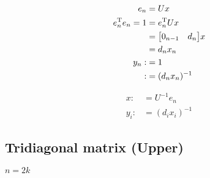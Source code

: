 \documentclass[11pt]{article}
\newcommand{\T}{\mathrm{T}}
\begin{document}
\begin{align*}
    e_{n} &= U x \\
    e_{n}^{\T} e_{n} = 1 &= e_{n}^{\T} U x \\
        &= \mqty[
            0_{n-1} & d_{n}
        ] x \\
        &= d_{n} x_{n} \\
    y_{n} :&= 1 \\
        :&= (d_{n} x_{n})^{-1}
\end{align*}

\begin{align*}
    x :&= U^{-1} e_n \\
    y_{i} :&= (d_{i} x_{i})^{-1}
\end{align*}




\newpage
\subsection{Tridiagonal matrix (Upper)}






$n = 2k$
\end{document}
